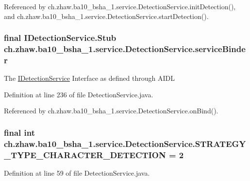 Referenced by ch.zhaw.ba10\_\-bsha\_\-1.service.DetectionService.initDetection(), and ch.zhaw.ba10\_\-bsha\_\-1.service.DetectionService.startDetection().\hypertarget{classch_1_1zhaw_1_1ba10__bsha__1_1_1service_1_1DetectionService_a9f24365c090a9ae586420e140fc97e0e}{
\subsubsection[{serviceBinder}]{\setlength{\rightskip}{0pt plus 5cm}final IDetectionService.Stub {\bf ch.zhaw.ba10\_\-bsha\_\-1.service.DetectionService.serviceBinder}}}
\label{classch_1_1zhaw_1_1ba10__bsha__1_1_1service_1_1DetectionService_a9f24365c090a9ae586420e140fc97e0e}
The \hyperlink{}{IDetectionService} Interface as defined through AIDL 

Definition at line 236 of file DetectionService.java.

Referenced by ch.zhaw.ba10\_\-bsha\_\-1.service.DetectionService.onBind().\hypertarget{classch_1_1zhaw_1_1ba10__bsha__1_1_1service_1_1DetectionService_a79f9a08bcebfb07d97dad403931d011d}{
\subsubsection[{STRATEGY\_\-TYPE\_\-CHARACTER\_\-DETECTION}]{\setlength{\rightskip}{0pt plus 5cm}final int {\bf ch.zhaw.ba10\_\-bsha\_\-1.service.DetectionService.STRATEGY\_\-TYPE\_\-CHARACTER\_\-DETECTION} = 2}}
\label{classch_1_1zhaw_1_1ba10__bsha__1_1_1service_1_1DetectionService_a79f9a08bcebfb07d97dad403931d011d}


Definition at line 59 of file DetectionService.java.


